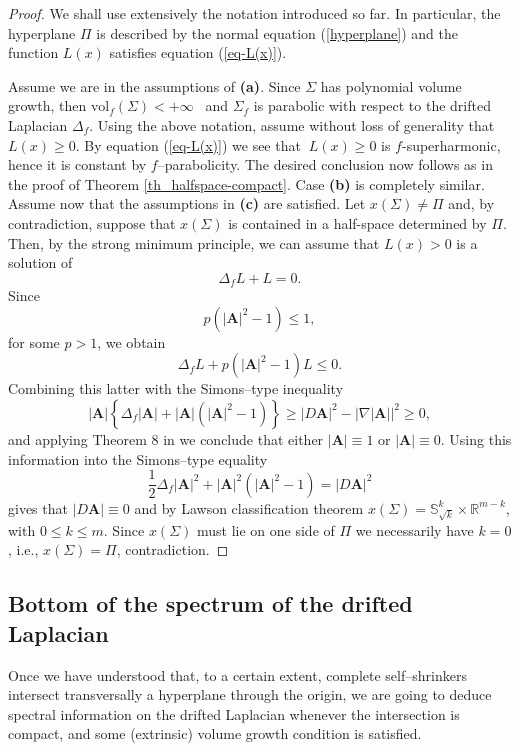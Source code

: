 \documentclass[11pt,leqno]{amsart}\usepackage{amsmath}
\numberwithin{equation}{section}
\begin{document}
\begin{proof} We shall use extensively the notation introduced so far. In particular, the hyperplane $\Pi$
is described by the normal equation (\ref{hyperplane}) and the function $L(x)$ satisfies equation (\ref{eq-L(x)}).

Assume we are in the assumptions of \textbf{(a)}. Since $\Sigma$ has polynomial volume growth, then
$\mathrm{vol}_{f}\left(  \Sigma\right)  <+\infty$ \ and $\Sigma_{f}$ is parabolic with
respect to the drifted Laplacian $\Delta_{f}$. Using the above notation,
assume without loss of generality that $L\left(  x\right)  \geq0$. By
equation (\ref{eq-L(x)}) we see that $\ L\left(  x\right)  \geq0$ is
$f$-superharmonic, hence it is constant by $f$--parabolicity. The desired
conclusion now follows as in the proof of Theorem \ref{th_halfspace-compact}. Case \textbf{(b)} is completely similar.
Assume now that the assumptions in \textbf{(c)} are satisfied. Let
$x\left(  \Sigma\right)  \neq\Pi$ and, by contradiction, suppose that
$x\left(  \Sigma\right)  $ is contained in a half-space determined by $\Pi$.
Then, by the strong minimum principle, we can assume that $L\left(  x\right)
>0$ is a solution of\[
\Delta_{f}L+L=0.
\]
Since\[
p\left(  \left\vert \mathbf{A}\right\vert ^{2}-1\right)  \leq 1,
\]
for some $p>1$, we obtain\[
\Delta_{f}L+p\left(  \left\vert \mathbf{A}\right\vert ^{2}-1\right)
L\leq0.
\]
Combining this latter with the Simons--type inequality\[
\left\vert \mathbf{A}\right\vert \left\{  \Delta_{f}\left\vert \mathbf{A}\right\vert +\left\vert \mathbf{A}\right\vert \left(  \left\vert
\mathbf{A}\right\vert ^{2}-1\right)  \right\}  \geq\left\vert D\mathbf{A}\right\vert ^{2}-\left\vert \nabla\left\vert \mathbf{A}\right\vert \right\vert
^{2}\geq0,
\]
and applying Theorem 8 in \cite{Ri-self} we conclude that either $\left\vert
\mathbf{A}\right\vert \equiv1$ or $\left\vert \mathbf{A}\right\vert \equiv0$.
Using this information into the Simons--type equality\[
\frac{1}{2}\Delta_{f}\left\vert \mathbf{A}\right\vert ^{2}+\left\vert
\mathbf{A}\right\vert ^{2}\left(  \left\vert \mathbf{A}\right\vert
^{2}-1\right)  =\left\vert D\mathbf{A}\right\vert ^{2}\]
gives that $\left\vert D\mathbf{A}\right\vert \equiv0$ and by Lawson
classification theorem $x(  \Sigma)  =\mathbb{S}^{k}_{  \sqrt{k}}
\times\mathbb{R}^{m-k}$, with $0\leq k\leq m$. Since $x\left(  \Sigma\right)
$ must lie on one side of $\Pi$ we necessarily have $k=0$, i.e., $x\left(  \Sigma\right)
=\Pi$, contradiction.
\end{proof}

\subsection{Bottom of the spectrum of the drifted Laplacian}
Once we have understood that, to a certain extent, complete self--shrinkers
intersect transversally a hyperplane through the origin, we are going to deduce
spectral information on the drifted Laplacian whenever the intersection is compact,
and some (extrinsic) volume growth condition is satisfied.
\end{document}
